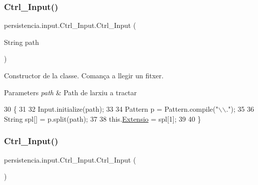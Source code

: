 \subsubsection{\texorpdfstring{Ctrl\+\_\+\+Input()}{Ctrl\_Input()}\hspace{0.1cm}{\footnotesize\ttfamily [1/2]}}
{\footnotesize\ttfamily persistencia.\+input.\+Ctrl\+\_\+\+Input.\+Ctrl\+\_\+\+Input (\begin{DoxyParamCaption}\item[{String}]{path }\end{DoxyParamCaption})\hspace{0.3cm}{\ttfamily [inline]}}



Constructor de la classe. Comança a llegir un fitxer. 


\begin{DoxyParams}{Parameters}
{\em path} & Path de l\textquotesingle{}arxiu a tractar \\
\hline
\end{DoxyParams}

\begin{DoxyCode}
30                                    \{
31   
32         Input.initialize(path);
33 
34         Pattern p = Pattern.compile(\textcolor{stringliteral}{"\(\backslash\)\(\backslash\)."});
35 
36         String spl[] = p.split(path);
37 
38         this.\hyperlink{classpersistencia_1_1input_1_1Ctrl__Input_a6041b56aa31f01f75d02382f98e259e5}{Extensio} = spl[1];
39 
40     \}
\end{DoxyCode}
\mbox{\label{classpersistencia_1_1input_1_1Ctrl__Input_a817ed61e715eb12261d844de34d84bec}} 
\subsubsection{\texorpdfstring{Ctrl\+\_\+\+Input()}{Ctrl\_Input()}\hspace{0.1cm}{\footnotesize\ttfamily [2/2]}}
{\footnotesize\ttfamily persistencia.\+input.\+Ctrl\+\_\+\+Input.\+Ctrl\+\_\+\+Input (\begin{DoxyParamCaption}{ }\end{DoxyParamCaption})\hspace{0.3cm}{\ttfamily [inline]}}




